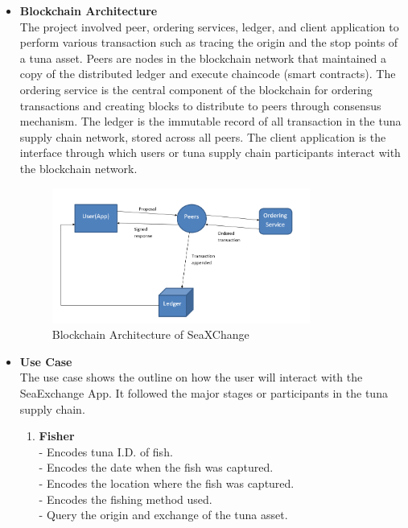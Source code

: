 	\begin{itemize}
		\item \textbf{Blockchain Architecture}
		\\The project involved peer, ordering services, ledger, and client application to perform various transaction such as tracing the origin and the stop points of a tuna asset. Peers are nodes in the blockchain network that maintained a copy of the distributed ledger and execute chaincode (smart contracts). The ordering service is the central component of the blockchain for ordering transactions and creating blocks to distribute to peers through consensus mechanism. The ledger is the immutable record of all transaction in the tuna supply chain network, stored across all peers. The client application is the interface through which users or tuna supply chain participants interact with the blockchain network.
		
		\begin{figure}[H]
			\centering
			\includegraphics[width=0.8\textwidth]{SeaXChange_model.png}
			\caption{Blockchain Architecture of SeaXChange}
			\label{fig:blockchain_model}
		\end{figure}
		
		
		
		\item \textbf{Use Case}
		\\The use case shows the outline on how the user will interact with the SeaExchange App. It followed the major stages or participants in the tuna supply chain. 
		\begin{enumerate}
			\item \textbf{Fisher}
			\\- Encodes tuna I.D. of fish.
			\\- Encodes the date when the fish was captured.
			\\- Encodes the location where the fish was captured.
			\\- Encodes the fishing method used.
			\\- Query the origin and exchange of the tuna asset.
			

\end{enumerate}
\end{itemize}
